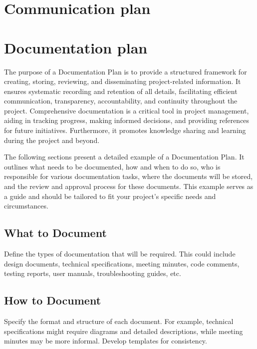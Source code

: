 \documentclass[10pt]{projectdoc}
\begin{document}
\section{Communication plan}



\section{Documentation plan}

The purpose of a Documentation Plan is to provide a structured framework for creating, storing, reviewing, and disseminating project-related information. It ensures systematic recording and retention of all details, facilitating efficient communication, transparency, accountability, and continuity throughout the project. Comprehensive documentation is a critical tool in project management, aiding in tracking progress, making informed decisions, and providing references for future initiatives. Furthermore, it promotes knowledge sharing and learning during the project and beyond.

The following sections present a detailed example of a Documentation Plan. It outlines what needs to be documented, how and when to do so, who is responsible for various documentation tasks, where the documents will be stored, and the review and approval process for these documents. This example serves as a guide and should be tailored to fit your project's specific needs and circumstances.

\subsection{What to Document}

Define the types of documentation that will be required. This could include design documents, technical specifications, meeting minutes, code comments, testing reports, user manuals, troubleshooting guides, etc.

\subsection{How to Document}

Specify the format and structure of each document. For example, technical specifications might require diagrams and detailed descriptions, while meeting minutes may be more informal. Develop templates for consistency.
\end{document}
